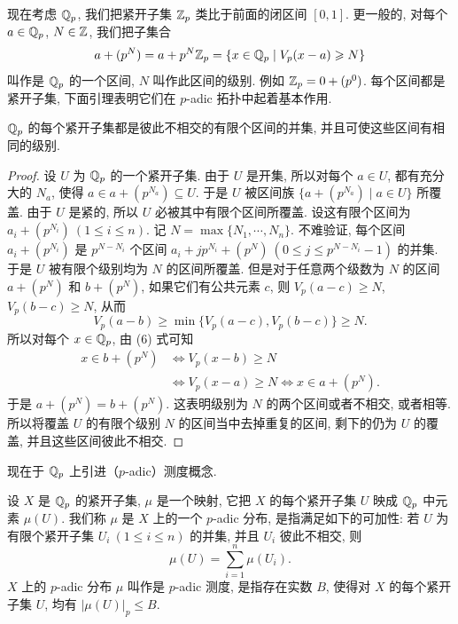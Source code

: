 现在考虑 $\mathbb{Q}_p$, 我们把紧开子集 $\mathbb{Z}_p$ 类比于前面的闭区间 $[0,1]$. 更一般的, 对每个 $a\in\mathbb{Q}_p$, $N\in\mathbb{Z}$, 我们把子集合
\[
  a+(p^N)=a+p^N\mathbb{Z}_p=\{x\in\mathbb{Q}_p\mid V_p(x-a)\geqslant N\}
\]
叫作是 $\mathbb{Q}_p$ 的一个区间, $N$ 叫作此区间的级别. 例如 $\mathbb{Z}_p=0+(p^0)$. 每个区间都是紧开子集, 下面引理表明它们在 $p$-adic 拓扑中起着基本作用.

\begin{lemma}\label{lem:ch9-7}
$\mathbb{Q}_p$ 的每个紧开子集都是彼此不相交的有限个区间的并集, 并且可使这些区间有相同的级别.
\end{lemma}

\begin{proof}
设 $U$ 为 $\mathbb{Q}_p$ 的一个紧开子集. 由于 $U$ 是开集, 所以对每个 $a\in U$, 都有充分大的 $N_a$, 使得 $a\in a+(p^{N_a})\subseteq U$. 于是 $U$ 被区间族 $\{a+(p^{N_a})\mid a\in U\}$ 所覆盖. 由于 $U$ 是紧的, 所以 $U$ 必被其中有限个区间所覆盖. 设这有限个区间为 $a_i+(p^{N_i})\ (1\leqslant i\leqslant n)$. 记 $N=\max\{N_1,\cdots,N_n\}$. 不难验证, 每个区间 $a_i+(p^{N_i})$ 是 $p^{N-N_i}$ 个区间 $a_i+jp^{N_i}+(p^N)\ (0\leqslant j\leqslant p^{N-N_i}-1)$ 的并集. 于是 $U$ 被有限个级别均为 $N$ 的区间所覆盖. 但是对于任意两个级数为 $N$ 的区间 $a+(p^N)$ 和 $b+(p^N)$, 如果它们有公共元素 $c$, 则 $V_p(a-c)\geqslant N$, $V_p(b-c)\geqslant N$, 从而
\begin{equation}\tag{6}
  V_p(a-b)\geqslant\min\{V_p(a-c),V_p(b-c)\}\geqslant N.
\end{equation}
所以对每个 $x\in\mathbb{Q}_p$, 由 (6) 式可知
\[
  \begin{aligned}
    x\in b+(p^N)&\Leftrightarrow V_p(x-b)\geqslant N\\
    &\Leftrightarrow V_p(x-a)\geqslant N\Leftrightarrow x\in a+(p^N).
  \end{aligned}
\]
于是 $a+(p^N)=b+(p^N)$. 这表明级别为 $N$ 的两个区间或者不相交, 或者相等. 所以将覆盖 $U$ 的有限个级别 $N$ 的区间当中去掉重复的区间, 剩下的仍为 $U$ 的覆盖, 并且这些区间彼此不相交.
\end{proof}

现在于 $\mathbb{Q}_p$ 上引进（$p$-adic）测度概念.

\begin{definition}\label{def:ch9-4}
设 $X$ 是 $\mathbb{Q}_p$ 的紧开子集, $\mu$ 是一个映射, 它把 $X$ 的每个紧开子集 $U$ 映成 $\mathbb{Q}_p$ 中元素 $\mu(U)$. 我们称 $\mu$ 是 $X$ 上的一个 $p$-adic 分布, 是指满足如下的可加性: 若 $U$ 为有限个紧开子集 $U_i\ (1\leqslant i\leqslant n)$ 的并集, 并且 $U_i$ 彼此不相交, 则
\[
  \mu(U)=\sum_{i=1}^{n}\mu(U_i).
\]
$X$ 上的 $p$-adic 分布 $\mu$ 叫作是 $p$-adic 测度, 是指存在实数 $B$, 使得对 $X$ 的每个紧开子集 $U$, 均有 $|\mu(U)|_p\leqslant B$.
\end{definition}

